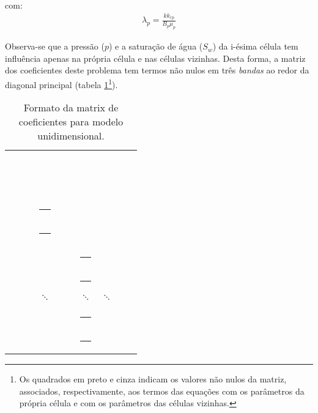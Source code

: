 \documentclass[final,5p]{elsarticle}
\numberwithin{equation}{section}
\newcommand*{\squareb}{\textcolor{black}{\rule{0.5em}{0.5em}}}
\newcommand*{\squareg}{\textcolor{gray}{\rule{0.5em}{0.5em}}}
\begin{document}
        \noindent com:
        \begin{align}
            \lambda_p = \frac{k k_{rp}}{B_p \mu_p} \nonumber
        \end{align}

        Observa-se que a pressão ($p$) e a saturação de água ($S_w$) da i-ésima célula tem influência apenas na própria célula e nas células vizinhas. Desta forma, a matriz dos coeficientes deste problema tem termos não nulos em três \emph{bandas} ao redor da diagonal principal (tabela \ref{tab:unidimensional}\footnote{Os quadrados em preto e cinza indicam os valores não nulos da matriz, associados, respectivamente, aos termos das equações com os parâmetros da própria célula e com os parâmetros das células vizinhas.}).

        \begin{table}
            \centering
            \caption{Formato da matrix de coeficientes para modelo unidimensional.}
            \label{tab:unidimensional}
            \bigskip
            \renewcommand{\arraystretch}{0.8}
            \begin{tabularx}{0.35\textwidth}{|XXXXXXXXXX|}
                \squareb & \squareb & \squareg &          &          &          &           &          &          &          \\
                \squareb & \squareb & \squareg &          &          &          &           &          &          &          \\
                \squareg &           & \squareb & \squareb & \squareg &          &           &          &          &          \\
                \squareg &           & \squareb & \squareb & \squareg &          &           &          &          &          \\
                         &           & \squareg &          & \squareb & \squareb & \squareg  &          &          &          \\
                         &           & \squareg &          & \squareb & \squareb & \squareg  &          &          &          \\
                         &           &          & $\ddots$ &          &          & $\ddots$  & $\ddots$ &          &          \\
                         &           &          &          &          &          &           &          &          &          \\
                         &           &          &          &          &          & \squareg  &          & \squareb & \squareb \\
                         &           &          &          &          &          & \squareg  &          & \squareb & \squareb \\
            \end{tabularx}
        \end{table}
\end{document}
